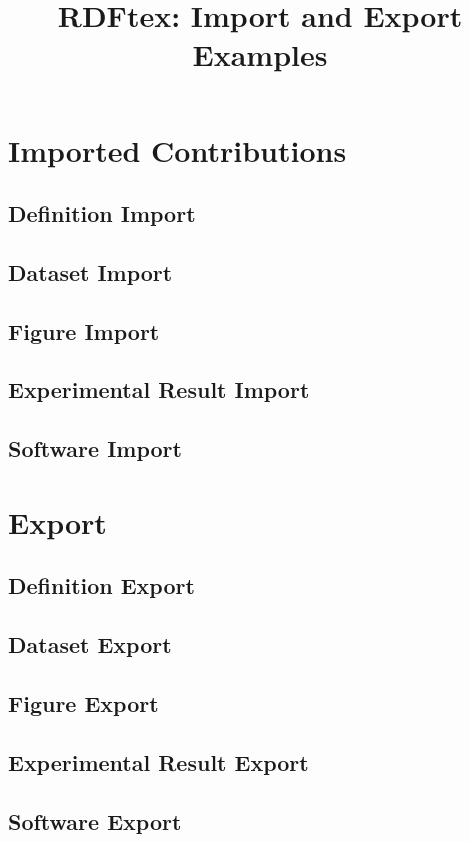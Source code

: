 \documentclass{article}
\title{RDFtex: Import and Export Examples}
\date{}
\begin{document}
\maketitle

\section{Imported Contributions}

\subsection*{Definition Import}

\subsection*{Dataset Import}

\subsection*{Figure Import}


\subsection*{Experimental Result Import}

\subsection*{Software Import}

\section{Export}

\subsection*{Definition Export}

\subsection*{Dataset Export}

\subsection*{Figure Export}

\subsection*{Experimental Result Export}

\subsection*{Software Export}



\end{document}
